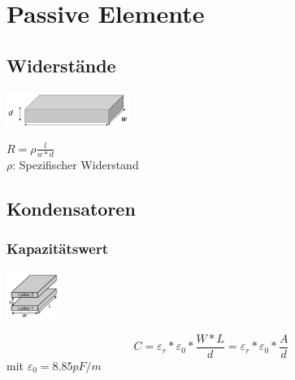 \section{Passive Elemente}

\subsection{Widerstände}
\begin{multicols}{2}
\includegraphics[width=0.3\textwidth]{pictures/widerstand.png}

\columnbreak

$R=\rho\frac{l}{w*d}$ \\
$\rho$: Spezifischer Widerstand
\end{multicols} 

\subsection{Kondensatoren}
\subsubsection{Kapazitätswert}
\begin{multicols}{2}
	\begin{center}
		\includegraphics[width=0.13\textwidth]{pictures/kapazitaetswert}
	\end{center}
	\columnbreak

	\begin{equation*}
		C=\varepsilon_{r}*\varepsilon_{0}*\frac{W*L}{d}=\varepsilon_{r}*\varepsilon_{0}*\frac{A}{d}
	\end{equation*}
	mit $\varepsilon_{0}= 8.85 pF/m$
\end{multicols}


